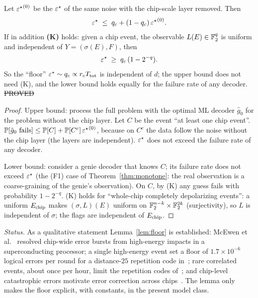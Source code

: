 \begin{lemma}\label{lem:floor}
Let ${\varepsilon^{\star}}^{(0)}$ be the $\varepsilon^{\star}$ of the same noise with the chip-scale layer removed. Then
\[
\varepsilon^{\star}\;\le\;q_c+(1-q_c)\,{\varepsilon^{\star}}^{(0)}.
\]
If in addition \textbf{(K)} holds: given a chip event, the observable $L(E)\in\mathbb{F}_2^q$ is uniform and independent of $Y=(\sigma(E),F)$, then
\[
\varepsilon^{\star}\;\ge\;q_c\,(1-2^{-q}).
\]
So the ``floor'' $\varepsilon^{\star}\sim q_c\propto r_cT_{\rm tot}$ is independent of $d$; the upper bound does not need (K), and the lower bound holds equally for the failure rate of any decoder.
\hfill\st{PROVED}
\end{lemma}
\begin{proof}
Upper bound: process the full problem with the optimal ML decoder $\hat g_0$ for the problem without the chip layer. Let $C$ be the event ``at least one chip event''.
$\mathbb{P}[\hat g_0\text{ fails}]\le\mathbb{P}[C]+\mathbb{P}[C^c]\,{\varepsilon^{\star}}^{(0)}$, because on $C^c$ the data follow the noise without the chip layer (the layers are independent).
$\varepsilon^{\star}$ does not exceed the failure rate of any decoder.

Lower bound: consider a genie decoder that knows $C$; its failure rate does not exceed $\varepsilon^{\star}$ (the (F1) case of Theorem~\ref{thm:monotone}: the real observation is a coarse-graining of the genie's observation).
On $C$, by (K) any guess fails with probability $1-2^{-q}$.
(K) holds for ``whole-chip completely depolarizing events'': a uniform $E_{\rm chip}$ makes $(\sigma,L)(E)$ uniform on $\mathbb{F}_2^{n-k}\times\mathbb{F}_2^{2k}$ (surjectivity),
so $L$ is independent of $\sigma$; the flags are independent of $E_{\rm chip}$.
\end{proof}
\noindent\emph{Status.} As a qualitative statement Lemma~\ref{lem:floor} is established: McEwen et al.~\cite{McEwen} resolved chip-wide error bursts from high-energy impacts in a superconducting processor; a single high-energy event set a floor of $1.7\times10^{-6}$ logical errors per round for a distance-$25$ repetition code in~\cite{Google22}; rare correlated events, about once per hour, limit the repetition codes of~\cite{Google24}; and chip-level catastrophic errors motivate error correction across chips~\cite{XuChip}. The lemma only makes the floor explicit, with constants, in the present model class.

